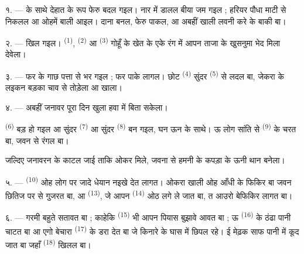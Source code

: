 
\VUsaut{5.0mm}
\VUsaut{3.0mm}
\VUsaut{3.0mm}
\VUsaut{4.0mm}
\VUsaut{3.0mm}

१. ---  के साथे देहात के रूप फेरु बदल गइल। नार में डालल
बीया जम गइल ; हरियर पौधा माटी से निकलल आ ओहमें बाली आइल। दाना बनल,
फेरु पाकल, आ अबहीं खाली लवनी करे के बाकी बा।

२. ---  खिल गइल। 
\textsuperscript{(1)},  \textsuperscript{(2)} आ
 \textsuperscript{(3)} गोहूँ के खेत के एके रंग में आपन
ताजा  के खुसनुमा भेद मिला देवेला।

३. --- फर के गाछ पत्ता से भर गइल ; फर पाके लागल। छोट  \textsuperscript{(4)} सुंदर  \textsuperscript{(5)} से लदल
बा, जेकरा के लइकन बड़का चाव से तोड़ेला आ खाला।

४. --- अबहीं जनावर पूरा दिन खुला हवा में बिता सकेला।

 \textsuperscript{(6)} बड़ हो गइल आ सुंदर 
\textsuperscript{(7)} आ सुंदर  \textsuperscript{(8)} बन गइल,
घन ऊन के साथे। ऊ लोग सांति से  \textsuperscript{(9)} के
 चरत बा, जवन  से रंगल बा।

जल्दिए  जनावरन के काटल जाई ताकि ओकर  मिले, जवना
से हमनी के कपड़ा के ऊनी थान बनेला।

\VUsaut{5.0mm}
\VUsaut{3.4mm}

५. ---  \textsuperscript{(10)} ओह लोग पर जादे धेयान नइखे
देत लागत। ओकरा खाली ओह आँधी के फिकिर बा जवन छितिज पर से गुजरत बा, आ
 \textsuperscript{(13)}, जे आपन 
\textsuperscript{(14)} ओठ लगे ले जात बा, त आउरो बेफिकिर लागत बा।

६. --- गरमी बहुते सतावत बा ; काहेकि  \textsuperscript{(15)}
भी आपन पियास बुझावे आवत बा ; ऊ  \textsuperscript{(16)} के
ठंढा पानी चाटत बा आ एगो बेचारा  \textsuperscript{(17)} के
डरा देत बा जे किनारे के घास में छिपल रहे। ई मेढ़क साफ पानी में कूद जात
बा जहाँ  \textsuperscript{(18)} खिलल बा।

